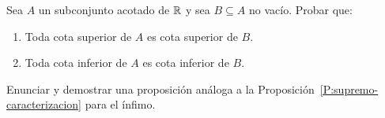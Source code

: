 
    \item Sea $A$ un subconjunto acotado de $\mathbb{R}$ y sea $B\subseteq A$ no vacío. Probar que: 
    \begin{enumerate}
        \item Toda cota superior de $A$ es cota superior de $B$.
        \item Toda cota inferior de $A$ es cota inferior de $B$.
    \end{enumerate}
    
    \item {}

    \item* Enunciar y demostrar una proposición análoga a la Proposición~\ref{P:supremo-caracterizacion} para el ínfimo.

    \item {}